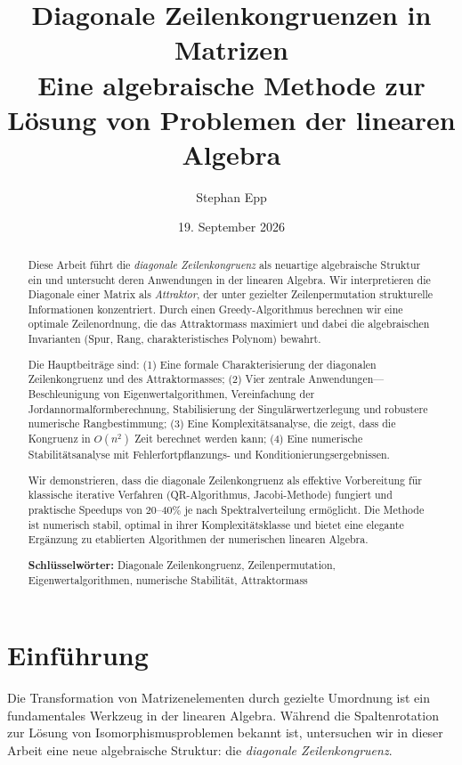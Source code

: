 \documentclass[a4paper,12pt]{article}
\title{\textbf{Diagonale Zeilenkongruenzen in Matrizen}\\
Eine algebraische Methode zur Lösung von Problemen der linearen Algebra}
\author{Stephan Epp}
\date{19. September 2026}
\theoremstyle{definition}
\begin{document}
\maketitle

\begin{abstract}
Diese Arbeit führt die \emph{diagonale Zeilenkongruenz} als neuartige algebraische Struktur ein und untersucht deren Anwendungen in der linearen Algebra. Wir interpretieren die Diagonale einer Matrix als \emph{Attraktor}, der unter gezielter Zeilenpermutation strukturelle Informationen konzentriert. Durch einen Greedy-Algorithmus berechnen wir eine optimale Zeilenordnung, die das Attraktormass maximiert und dabei die algebraischen Invarianten (Spur, Rang, charakteristisches Polynom) bewahrt.

Die Hauptbeiträge sind: (1) Eine formale Charakterisierung der diagonalen Zeilenkongruenz und des Attraktormasses; (2) Vier zentrale Anwendungen—Beschleunigung von Eigenwertalgorithmen, Vereinfachung der Jordannormalformberechnung, Stabilisierung der Singulärwertzerlegung und robustere numerische Rangbestimmung; (3) Eine Komplexitätsanalyse, die zeigt, dass die Kongruenz in $O(n^2)$ Zeit berechnet werden kann; (4) Eine numerische Stabilitätsanalyse mit Fehlerfortpflanzungs- und Konditionierungsergebnissen.

Wir demonstrieren, dass die diagonale Zeilenkongruenz als effektive Vorbereitung für klassische iterative Verfahren (QR-Algorithmus, Jacobi-Methode) fungiert und praktische Speedups von $20$–$40\%$ je nach Spektralverteilung ermöglicht. Die Methode ist numerisch stabil, optimal in ihrer Komplexitätsklasse und bietet eine elegante Ergänzung zu etablierten Algorithmen der numerischen linearen Algebra.

\textbf{Schlüsselwörter:} Diagonale Zeilenkongruenz, Zeilenpermutation, Eigenwertalgorithmen, numerische Stabilität, Attraktormass
\end{abstract}

\tableofcontents

\newpage

\section{Einführung}

Die Transformation von Matrizenelementen durch gezielte Umordnung ist ein fundamentales Werkzeug in der linearen Algebra. Während die Spaltenrotation zur Lösung von Isomorphismusproblemen bekannt ist, untersuchen wir in dieser Arbeit eine neue algebraische Struktur: die \emph{diagonale Zeilenkongruenz}.
\end{document}

